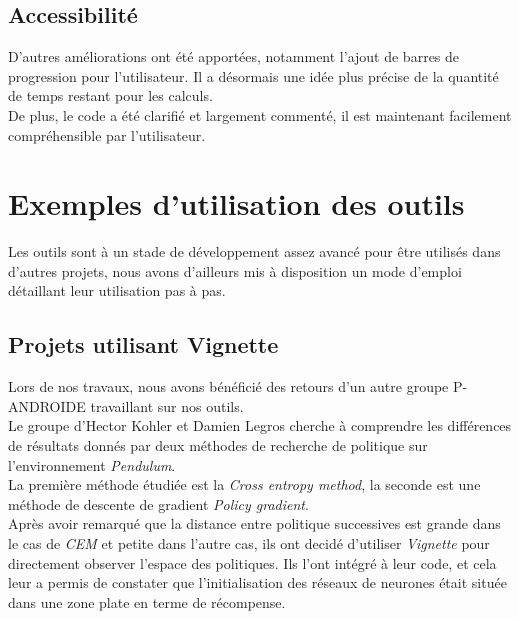 \documentclass[12pt]{article}
\begin{document}

\subsection{Accessibilité}

D’autres améliorations ont été apportées, notamment l’ajout de barres de progression pour l’utilisateur. Il a désormais une idée plus précise de la quantité de temps restant pour les calculs. \\

De plus, le code a été clarifié et largement commenté, il est maintenant facilement compréhensible par l’utilisateur. \\

\section{Exemples d'utilisation des outils}

Les outils sont à un stade de développement assez avancé pour être utilisés dans d'autres projets, nous avons d'ailleurs mis à disposition un mode d'emploi détaillant leur utilisation pas à pas. \\

\subsection{Projets utilisant Vignette}

Lors de nos travaux, nous avons bénéficié des retours d'un autre groupe P-ANDROIDE travaillant sur nos outils. \\

Le groupe d'Hector Kohler et Damien Legros cherche à comprendre les différences de résultats donnés par deux méthodes de recherche de politique sur l'environnement \emph{Pendulum}. \\

La première méthode étudiée est la \emph{Cross entropy method}, la seconde est une méthode de descente de gradient \emph{Policy gradient}. \\

Après avoir remarqué que la distance entre politique successives est grande dans le cas de \emph{CEM} et petite dans l'autre cas, ils ont decidé d'utiliser \emph{Vignette} pour directement observer l'espace des politiques. Ils l'ont intégré à leur code, et cela leur a permis de constater que l'initialisation des réseaux de neurones était située dans une zone plate en terme de récompense. \\
\end{document}
